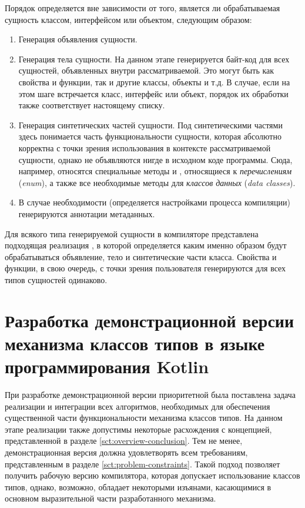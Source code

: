Порядок определяется вне зависимости от того, является ли обрабатываемая сущность классом, интерфейсом или объектом, следующим образом:
\begin{enumerate}
    \item Генерация объявления сущности.
    \item Генерация тела сущности. На данном этапе генерируется байт-код для всех сущностей, объявленных внутри рассматриваемой. Это могут быть как свойства и функции, так и другие классы, объекты и т.д. В случае, если на этом шаге встречается класс, интерфейс или объект, порядок их обработки также соответствует настоящему списку. 
    \item Генерация синтетических частей сущности. Под синтетическими частями здесь понимается часть функциональности сущности, которая абсолютно корректна с точки зрения использования в контексте рассматриваемой сущности, однако не объявляются нигде в исходном коде программы. Сюда, например, относятся специальные методы  и , относящиеся к \emph{перечислениям} (\emph{enum}), а также все необходимые методы для \emph{классов данных} (\emph{data classes}).  
    \item В случае необходимости (определяется настройками процесса компиляции) генерируются аннотации метаданных.
\end{enumerate}
Для всякого типа генерируемой сущности в компиляторе представлена подходящая реализация , в которой определяется каким именно образом будут обрабатываться объявление, тело и синтетические части класса. Свойства и функции, в свою очередь, с точки зрения пользователя  генерируются для всех типов сущностей одинаково.

\section{Разработка демонстрационной версии механизма классов типов в языке программирования Kotlin}

При разработке демонстрационной версии приоритетной была поставлена задача реализации и интеграции всех алгоритмов, необходимых для обеспечения существенной части функциональности механизма классов типов. На данном этапе реализации также допустимы некоторые расхождения с концепцией, представленной в разделе \ref{sct:overview-conclusion}. Тем не менее, демонстрационная версия должна удовлетворять всем требованиям, представленным в разделе \ref{sct:problem-constraints}. Такой подход позволяет получить рабочую версию компилятора, которая допускает использование классов типов, однако, возможно, обладает некоторыми изъянами, касающимися в основном выразительной части разработанного механизма. 


